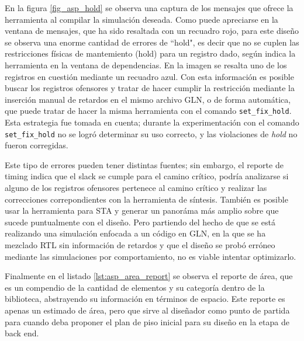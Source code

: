 En la figura \ref{fig_asp_hold} se observa una captura de los mensajes que ofrece la herramienta al compilar la simulación deseada. Como puede apreciarse en la ventana de mensajes, que ha sido resaltada con un recuadro rojo, para este diseño se observa una enorme cantidad de errores de ``hold", es decir que no se cuplen las restricciones físicas de mantemiento (hold) para un registro dado, según indica la herramienta en la ventana de dependencias. En la imagen se resalta uno de los registros en cuestión mediante un recuadro azul. Con esta información es posible buscar los registros ofensores y tratar de hacer cumplir la restricción mediante la inserción manual de retardos en el mismo archivo GLN, o de forma automática, que puede tratar de hacer la misma herramienta con el comando \texttt{set\_fix\_hold}. Esta estrategia fue tomada en cuenta; durante la experimentación con el comando \texttt{set\_fix\_hold} no se logró determinar su uso correcto, y las violaciones de \textit{hold} no fueron corregidas.

Este tipo de errores pueden tener distintas fuentes; sin embargo, el reporte de timing indica que el slack se cumple para el camino crítico, podría analizarse si alguno de los registros ofensores pertenece al camino crítico y realizar las correcciones correpondientes con la herramienta de síntesis. También es posible usar la herramienta para STA y generar un panoráma más amplio sobre que sucede puntualmente con el diseño. Pero partiendo del hecho de que se está realizando una simulación enfocada a un código en GLN, en la que se ha mezclado RTL sin información de retardos y que el diseño se probó erróneo mediante las simulaciones por comportamiento, no es viable intentar optimizarlo.

Finalmente en el listado \ref{lst:asp_area_report} se observa el reporte de área, que es un compendio de la cantidad de elementos y su categoría dentro de la biblioteca, abstrayendo su información en términos de espacio. Este reporte es apenas un estimado de área, pero que sirve al diseñador como punto de partida para cuando deba proponer el plan de piso inicial para su diseño en la etapa de back end. 


